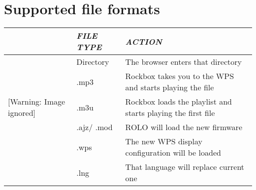 \section{Supported file formats}
\begin{center}\begin{tabular}{|p{0.46100003cm}|p{3.296cm}|p{12.339cm}|}
\hline
&
{\centering\bfseries\itshape
FILE TYPE
\par}
&
{\centering\bfseries\itshape
ACTION
\par}
\\\hline
  [Warning: Image ignored] %
 
&
Directory
&
The browser enters that directory
\\\hline
  [Warning: Image ignored] %
 
&
.mp3
&
Rockbox takes you to the WPS and starts playing the file
\\\hline
 [Warning: Image ignored]
 [Warning: Image ignored]
 
&
.m3u
&
Rockbox loads the playlist and starts playing the first file
\\\hline
  [Warning: Image ignored] %
 
&
.ajz/ .mod
&
ROLO will load the new firmware
\\\hline
  [Warning: Image ignored] %
 
&
.wps
&
The new WPS display configuration will be loaded
\\\hline
  [Warning: Image ignored] %
 
&
.lng
&
That language will replace current one
\\\hline
  [Warning: Image ignored] %
 

\end{tabular}
\end{center}
